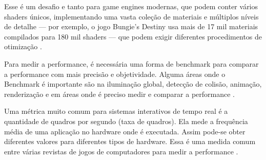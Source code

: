 Esse é um desafio e tanto para game engines modernas, que podem conter vários shaders únicos, implementando uma vasta coleção de materiais e múltiplos níveis de detalhe --- por exemplo, o jogo Bungie’s Destiny usa mais de 17 mil materiais compilados para 180 mil shaders --- que podem exigir diferentes procedimentos de otimização \cite{he2016rapid}.

Para medir a performance, é necessária uma forma de \Gls{benchmark} para comparar a performance com mais precisão e objetividade. Alguma áreas onde o Benchmark é importante são na iluminação global, detecção de colisão, animação, renderização e em áreas onde é preciso medir e comparar a performance \cite{lext2001ray}.

Uma métrica muito comum para sistemas interativos de tempo real é a quantidade de quadros por segundo (taxa de quadros). Ela mede a frequência média de uma aplicação no hardware onde é executada. Assim pode-se obter diferentes valores para diferentes tipos de hardware. Essa é uma medida comum entre várias revistas de jogos de computadores para medir a performance \cite{rehfeld2014profile}.
